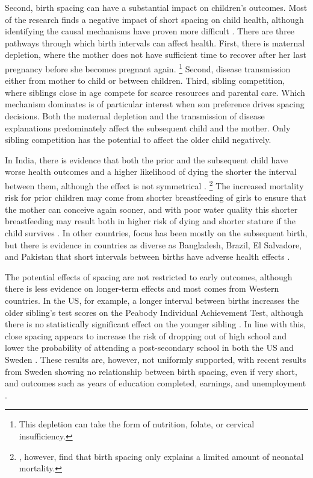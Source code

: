 \documentclass[12pt,letterpaper]{article}
\begin{document}
Second, birth spacing can have a substantial impact on children's outcomes.
Most of the research finds a negative impact of short spacing on child health, although 
identifying the causal mechanisms have proven more difficult
\citep{Conde-Agudelo2006,Conde-Agudelo2012}.
There are three pathways through which birth intervals can affect health.
First, there is maternal depletion, where the mother does not have sufficient time to 
recover after her last pregnancy before she becomes pregnant again.%
\footnote{
This depletion can take the form of nutrition, folate, or cervical insufficiency.
}
Second, disease transmission either from mother to child or between children.
Third, sibling competition, where siblings close in age compete for scarce resources and
parental care.
Which mechanism dominates is of particular interest when son preference drives spacing 
decisions.
Both the maternal depletion and the transmission of disease explanations predominately
affect the subsequent child and the mother.
Only sibling competition has the potential to affect the older child negatively.

In India, there is evidence that both the prior and the subsequent child have worse health 
outcomes and a higher likelihood of dying the shorter the interval between them, although 
the effect is not symmetrical
\citep{Whitworth2002,Bhargava2003,Rutstein2005,Maitra2008,Makepeace2008,Ghosh2018}.%
\footnote{
\cite{Bhalotra2008}, however, find that birth spacing only explains a limited amount
of neonatal mortality.
}
The increased mortality risk for prior children may come from shorter breastfeeding of 
girls to ensure that the mother can conceive again sooner, and with poor water
quality this shorter breastfeeding may result both in higher risk of dying and shorter
stature if the child survives \citep{Jayachandran2011,Jayachandran2017a}.
In other countries, focus has been mostly on the subsequent birth, but there is evidence 
in countries as diverse as Bangladesh, Brazil, El Salvadore, and Pakistan that
short intervals between births have adverse health effects
\citep{Cleland1984,Curtis1993,Davanzo2008,Gribble2009,Saha2013}.

The potential effects of spacing are not restricted to early outcomes, although
there is less evidence on longer-term effects and most comes from Western countries.
In the US, for example, a longer interval between births increases the older sibling's
test scores on the Peabody Individual Achievement Test, although there is no
statistically significant effect on the younger sibling \citep{Buckles2012}.
In line with this, close spacing appears to increase the risk of dropping out of
high school and lower the probability of attending a post-secondary school in both the
US and Sweden \citep{Powell1993,Pettersson-Lidbom2009}.
These results are, however, not uniformly supported, with recent results from Sweden 
showing no relationship between birth spacing, even if very short, and outcomes such as 
years of education completed, earnings, and unemployment \citep{Barclay2017}.
\end{document}

